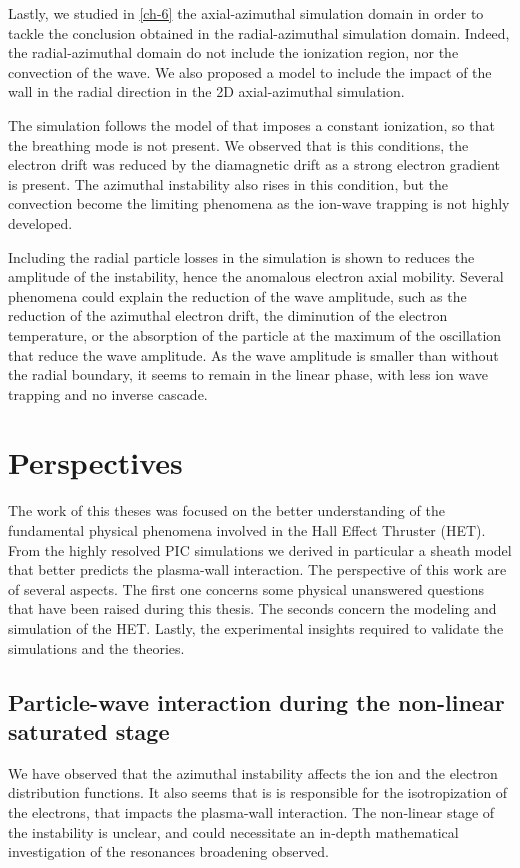Lastly, we studied in \cref{ch-6} the axial-azimuthal simulation domain in order to tackle the conclusion obtained in the radial-azimuthal simulation domain.
Indeed, the radial-azimuthal domain do not include the ionization region, nor the convection of the wave.
We also proposed a model to include the impact of the wall in the radial direction in the 2D axial-azimuthal simulation.

The simulation follows the model of \citet{boeuf2018} that imposes a constant ionization, so that the breathing mode is not present.
We observed that is this conditions, the electron drift was reduced by the diamagnetic drift as a strong electron gradient is present.
The azimuthal instability also rises in this condition, but the convection become the limiting phenomena as the ion-wave trapping is not highly developed.

Including the radial particle losses in the simulation is shown to reduces the amplitude of the instability, hence the anomalous electron axial mobility.
Several phenomena could explain the reduction of the wave amplitude, such as the reduction of the azimuthal electron drift, the diminution of the electron temperature, or the absorption of the particle at the maximum of the oscillation that reduce the wave amplitude.
As the wave amplitude is smaller than without the radial boundary, it seems to remain in the linear phase, with less ion wave trapping and no inverse cascade.

\section{Perspectives}

The work of this theses was focused on the better understanding of the fundamental physical phenomena involved in the Hall Effect Thruster (HET).
From the highly resolved PIC simulations we derived in particular a sheath model that better predicts the plasma-wall interaction.
The perspective of this work are of several aspects.
The first one concerns some physical unanswered questions that have been raised during this thesis.
The seconds concern the modeling and simulation of the HET.
Lastly, the experimental insights required to validate the simulations and the theories.

\subsection{Particle-wave interaction during the non-linear saturated stage}
We have observed that the azimuthal instability affects the ion and the electron distribution functions.
It also seems that is is responsible for the isotropization of the electrons, that impacts the plasma-wall interaction.
The non-linear stage of the instability is unclear, and could necessitate an in-depth mathematical investigation of the resonances broadening observed.

